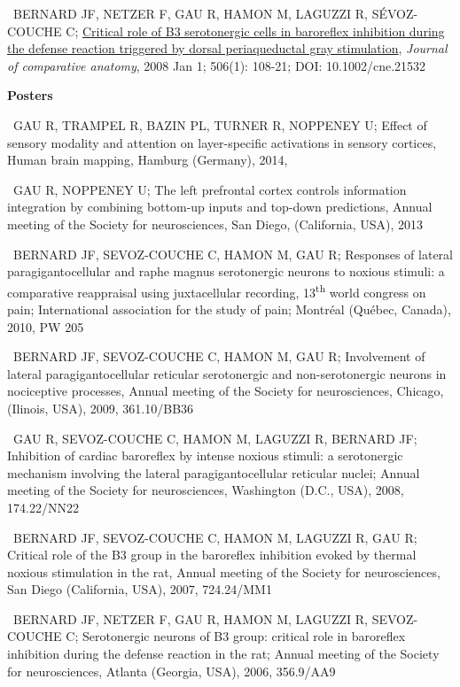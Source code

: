 \documentclass[a4paper,12pt,oneside]{letter}
\begin{document}
{\textbullet~BERNARD JF, NETZER F, GAU R, HAMON M, LAGUZZI R, SÉVOZ-COUCHE C; \href{http://onlinelibrary.wiley.com/doi/10.1002/cne.21532/abstract;jsessionid=5BCAA74755E291EB3D5A1BF64254181B.d01t02}{Critical role of B3 serotonergic cells in baroreflex inhibition during the defense reaction triggered by dorsal periaqueductal gray stimulation}, \textit{Journal of comparative anatomy}, 2008 Jan 1; 506(1): 108-21; DOI: 10.1002/cne.21532

\begin{center}
\Large\textbf{Posters}
\end{center}

\textbullet~GAU R, TRAMPEL R, BAZIN PL, TURNER R, NOPPENEY U; Effect of sensory modality and attention on layer-specific activations in sensory cortices, Human brain mapping, Hamburg (Germany), 2014, %

\textbullet~GAU R, NOPPENEY U; The left prefrontal cortex controls information integration by combining bottom-up inputs and top-down predictions, Annual meeting of the Society for neurosciences, San Diego, (California, USA), 2013 %

\textbullet~BERNARD JF, SEVOZ-COUCHE C, HAMON M, GAU R; Responses of lateral paragigantocellular and raphe magnus serotonergic neurons to noxious stimuli: a comparative reappraisal using juxtacellular recording, 13\textsuperscript{th} world congress on pain; International association for the study of pain; Montréal (Québec, Canada), 2010, PW 205 

\textbullet~BERNARD JF, SEVOZ-COUCHE C, HAMON M, GAU R; Involvement of lateral paragigantocellular reticular serotonergic and non-serotonergic neurons in nociceptive processes, Annual meeting of the Society for neurosciences, Chicago, (Ilinois, USA), 2009, 361.10/BB36

\textbullet~GAU R, SEVOZ-COUCHE C, HAMON M, LAGUZZI R, BERNARD JF; Inhibition of cardiac baroreflex by intense noxious stimuli: a serotonergic mechanism involving the lateral paragigantocellular reticular nuclei; Annual meeting of the Society for neurosciences, Washington (D.C., USA), 2008, 174.22/NN22

\textbullet~BERNARD JF, SEVOZ-COUCHE C, HAMON M, LAGUZZI R, GAU R; Critical role of the B3 group in the baroreflex inhibition evoked by thermal noxious stimulation in the rat, Annual meeting of the Society for neurosciences, San Diego (California, USA), 2007, 724.24/MM1

\textbullet~BERNARD JF, NETZER F, GAU R, HAMON M, LAGUZZI R, SEVOZ-COUCHE C; Serotonergic neurons of B3 group: critical role in baroreflex inhibition during the defense reaction in the rat; Annual meeting of the Society for neurosciences, Atlanta (Georgia, USA), 2006, 356.9/AA9

}
\end{document}
